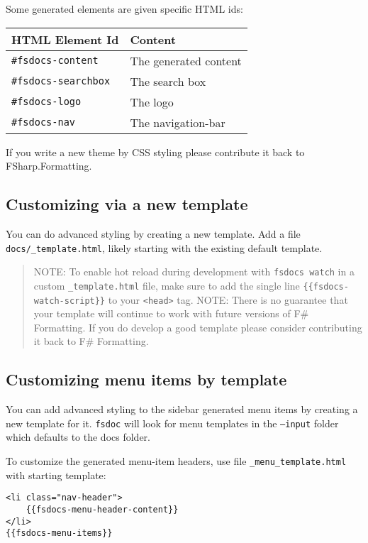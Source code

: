 \documentclass{article}
\begin{document}
Some generated elements are given specific HTML ids:
\begin{tabular}{|l|l|}\hline
\textbf{HTML Element Id} & \textbf{Content}\\ \hline\hline
\texttt{\#fsdocs-content} & The generated content\\ \hline
\texttt{\#fsdocs-searchbox} & The search box\\ \hline
\texttt{\#fsdocs-logo} & The logo\\ \hline
\texttt{\#fsdocs-nav} & The navigation-bar\\ \hline
\end{tabular}



If you write a new theme by CSS styling please contribute it back to FSharp.Formatting.
\subsection*{Customizing via a new template}



You can do advanced styling by creating a new template.  Add a file \texttt{docs/\_template.html}, likely starting
with the existing default template.
\begin{quote}


NOTE: To enable hot reload during development with \texttt{fsdocs watch} in a custom \texttt{\_template.html} file,
make sure to add the single line \texttt{\{\{fsdocs-watch-script\}\}}  to your \texttt{<head>} tag.
NOTE: There is no guarantee that your template will continue to work with future versions of F\# Formatting.
If you do develop a good template please consider contributing it back to F\# Formatting.
\end{quote}

\subsection*{Customizing menu items by template}



You can add advanced styling to the sidebar generated menu items by creating a new template for it.
\texttt{fsdoc} will look for menu templates in the \texttt{--input} folder which defaults to the docs folder.


To customize the generated menu-item headers, use file \texttt{\_menu\_template.html} with starting template:
\begin{lstlisting}
<li class="nav-header">
    {{fsdocs-menu-header-content}}
</li>
{{fsdocs-menu-items}}

\end{lstlisting}
\end{document}
